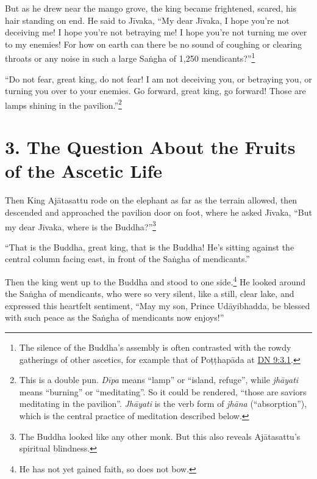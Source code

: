 \documentclass[12pt,openany]{book}%
\begin{document}
But as he drew near the mango grove, the king became frightened, scared, his hair standing on end. He said to \textsanskrit{Jīvaka}, “My dear \textsanskrit{Jīvaka}, I hope you’re not deceiving me! I hope you’re not betraying me! I hope you’re not turning me over to my enemies! For how on earth can there be no sound of coughing or clearing throats or any noise in such a large \textsanskrit{Saṅgha} of 1,250 mendicants?”\footnote{The silence of the Buddha’s assembly is often contrasted with the rowdy gatherings of other ascetics, for example that of \textsanskrit{Poṭṭhapāda} at \href{https://suttacentral.net/dn9/en/sujato\#3.1}{DN 9:3.1}. } 

“Do not fear, great king, do not fear! I am not deceiving you, or betraying you, or turning you over to your enemies. Go forward, great king, go forward! Those are lamps shining in the pavilion.”\footnote{This is a double pun. \textit{\textsanskrit{Dīpa}} means “lamp” or “island, refuge”, while \textit{\textsanskrit{jhāyati}} means “burning” or “meditating”. So it could be rendered, “those are saviors meditating in the pavilion”. \textit{\textsanskrit{Jhāyati}} is the verb form of \textit{\textsanskrit{jhāna}} (“absorption”), which is the central practice of meditation described below. } 

\section*{3. The Question About the Fruits of the Ascetic Life }

Then King \textsanskrit{Ajātasattu} rode on the elephant as far as the terrain allowed, then descended and approached the pavilion door on foot, where he asked \textsanskrit{Jīvaka}, “But my dear \textsanskrit{Jīvaka}, where is the Buddha?”\footnote{The Buddha looked like any other monk. But this also reveals \textsanskrit{Ajātasattu}’s spiritual blindness. } 

“That is the Buddha, great king, that is the Buddha! He’s sitting against the central column facing east, in front of the \textsanskrit{Saṅgha} of mendicants.” 

Then the king went up to the Buddha and stood to one side.\footnote{He has not yet gained faith, so does not bow. } He looked around the \textsanskrit{Saṅgha} of mendicants, who were so very silent, like a still, clear lake, and expressed this heartfelt sentiment, “May my son, Prince \textsanskrit{Udāyibhadda}, be blessed with such peace as the \textsanskrit{Saṅgha} of mendicants now enjoys!” 
\end{document}
